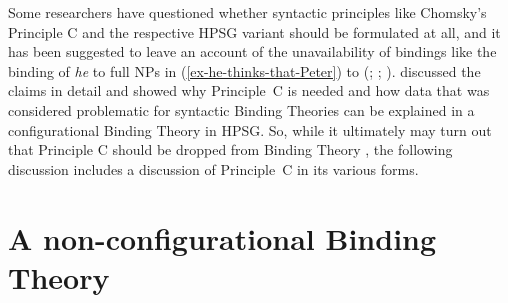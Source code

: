 \documentclass[output=paper,biblatex,babelshorthands,newtxmath,draftmode,colorlinks,citecolor=brown]{langscibook}
\begin{document}
Some researchers have questioned whether syntactic principles like Chomsky's Principle C and the
respective HPSG variant should be formulated at all, and it has been suggested to leave an account of the
unavailability of bindings like the binding of \emph{he} to full NPs in
(\ref{ex-he-thinks-that-Peter}) to  (\citealp[]{Bolinger79a-u}; \citealp[--228]{Bresnan2001a};
\citealp*[]{BMS2001a}). \citet[Section~6]{Walker2011a} discussed the claims in detail
and showed why Principle~C is needed and how data that was considered problematic for syntactic
Binding Theories can be explained in a configurational Binding Theory in HPSG. So, while it ultimately may turn
out that Principle C should be dropped from Binding Theory \citep*{VaraschinCulicoverWinkler2021a-u}, the following
discussion includes a discussion of Principle~C in its various forms.

\section{A non-configurational Binding Theory}
\label{binding:sec-a-non-configurational-binding-theory}
\end{document}
